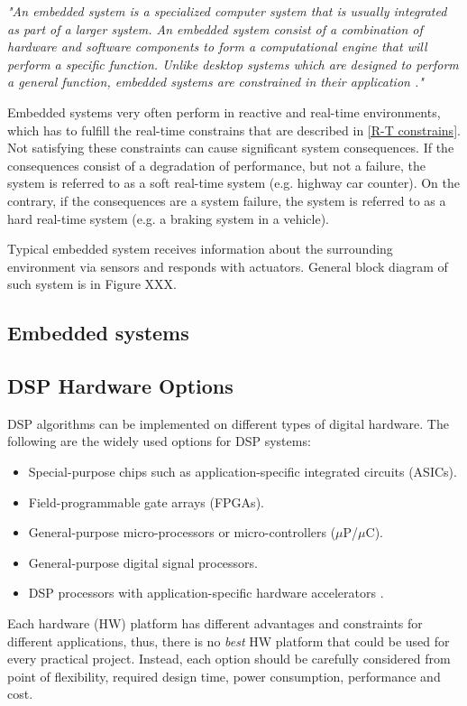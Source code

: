\documentclass[twoside]{ctuthesis}
\theoremstyle{plain}
\theoremstyle{definition}
\theoremstyle{note}
\begin{document}
\textit{"An embedded system is a specialized computer system that is usually integrated as part of a larger system. An embedded system consist of a combination of hardware and software components to form a computational engine that will perform a specific function. Unlike desktop systems which are designed to perform a general function, embedded systems are constrained in their application \cite{cite:SE_for_ES}."}

Embedded systems very often perform in reactive and real-time environments, which has to fulfill the real-time constrains that are described in \ref{R-T constrains}. Not satisfying these constraints can cause significant system consequences. If the consequences consist of a degradation of performance, but not a failure, the system is referred to as a soft real-time system (e.g. highway car counter). On the contrary, if the consequences are a system failure, the system is referred to as a hard real-time system (e.g. a braking system in a vehicle). 

Typical embedded system receives information about the surrounding environment via sensors and responds with actuators. General block diagram of such system is in Figure XXX.																	
\subsection{Embedded systems}

\subsection{DSP Hardware Options}
DSP algorithms can be implemented on different types of digital hardware. The following are the widely used options for DSP systems:
\begin{itemize}
	\setlength{\itemsep}{5pt}
\item Special-purpose chips such as application-specific integrated circuits (ASICs).
\item Field-programmable gate arrays (FPGAs).
\item General-purpose micro-processors or micro-controllers ($\mu$P/$\mu$C).
\item General-purpose digital signal processors.
\item DSP processors with application-specific hardware accelerators \cite{cite:RT_DSP}.
\end{itemize}

Each hardware (HW) platform has different advantages and constraints for different applications, thus, there is no \textit{best} HW platform that could be used for every practical project. Instead, each option should be carefully considered from point of flexibility, required design time, power consumption, performance and cost. 
\end{document}
